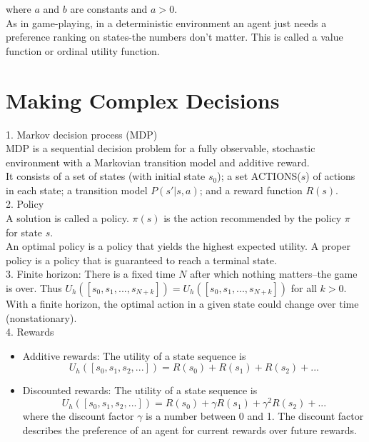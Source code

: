 \documentclass[12pt]{article}
\begin{document}
where $a$ and $b$ are constants and $a>0$. \\

As in game-playing, in a deterministic environment an agent just needs a preference ranking on states-the numbers don't matter. This is called a value function or ordinal utility function.

\section{Making Complex Decisions}

1. Markov decision process (MDP) \\

MDP is a sequential decision problem for a fully observable, stochastic environment with a Markovian transition model and additive reward. \\

It consists of a set of states (with initial state $s_0$); a set ACTIONS($s$) of actions in each state; a transition model $P(s'| s, a)$; and a reward function $R(s)$. \\

2. Policy \\

A solution is called a policy. $\pi(s)$ is the action recommended by the policy $\pi$ for state $s$. \\

An optimal policy is a policy that yields the highest expected utility. A proper policy is a policy that is guaranteed to reach a terminal state. \\

3. Finite horizon: There is a fixed time $N$ after which nothing matters--the game is over. Thus $U_h([s_0, s_1,...,s_{N+k}]) = U_h([s_0, s_1,...,s_{N+k}])$ for all $k>0$.  With a finite horizon, the optimal action in a given state could change over time (nonstationary). \\

4. Rewards
\begin{itemize}
\item Additive rewards: The utility of a state sequence is
  \begin{equation*}
    U_h([s_0,s_1,s_2,...]) = R(s_0)+R(s_1)+R(s_2)+...
  \end{equation*}
\item Discounted rewards: The utility of a state sequence is
  \begin{equation*}
    U_h([s_0,s_1,s_2,...])
    = R(s_0) + \gamma R(s_1) + \gamma^2 R(s_2)+...
  \end{equation*}
  where the discount factor $\gamma$ is a number between 0 and 1. The discount factor describes the preference of an agent for current rewards over future rewards.
\end{itemize}
\end{document}
